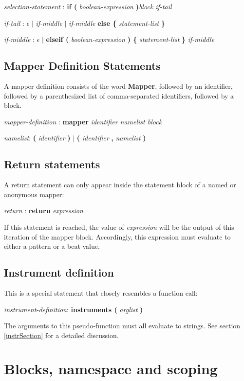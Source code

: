 \emph{selection-statement} : \textbf{if ( } \emph{boolean-expression} \textbf{ )}\emph{block if-tail}

\emph{if-tail} : $\epsilon$ $|$ \emph{if-middle} $|$
\emph{if-middle} \textbf{else \{} \emph{statement-list} \textbf{\}}

\emph{if-middle} : $\epsilon$ $|$ \textbf{elseif ( } \emph{boolean-expression} \textbf{ ) \{} \emph{statement-list} \textbf{\}} \emph{if-middle}

\subsection{Mapper Definition Statements}\label{MapperDefinitionStatement}

A mapper definition consists of the word \textbf{Mapper}, followed by an identifier, followed by a parenthesized list of comma-separated identifiers, followed by a block.

\emph{mapper-definition} : \textbf{mapper} \emph{identifier namelist block}

\emph{namelist}: \textbf ( \emph{identifier} \textbf ) $|$  \textbf ( \emph{identifier}
\textbf{,} \emph{namelist} \textbf )

\subsection{Return statements}

A return statement can only appear inside the statement block of a named or anonymous mapper:

\emph{return} : \textbf{return} \emph{expression}

If this statement is reached, the value of \emph{expression} will be the output of this iteration of the mapper block.  Accordingly, this expression must evaluate to either a pattern or a beat value.

\subsection{Instrument definition}

This is a special statement that closely resembles a function call:

\emph{instrument-definition}: \textbf{instruments (} \emph{arglist} \textbf{)}

The arguments to this pseudo-function must all evaluate to strings.  See section \ref{instrSection} for
a detailed discussion.

\section{Blocks, namespace and scoping}

